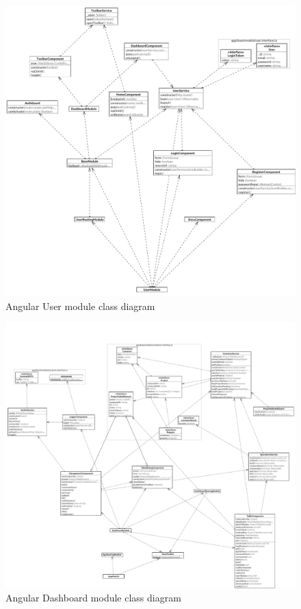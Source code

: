 \documentclass[multi, tikz, a4paper, oneside]{article}
\begin{document}
\begin{figure}[h]
  \centering \includegraphics[scale=0.15]{diagrams/client-side_diagram1.png}
  \caption{Angular User module class diagram}
  \label{fig:class-user}
\end{figure}
\begin{figure}[h]
  \centering
  \includegraphics[scale=0.1]{diagrams/client-side_diagram2.png}
  \caption{Angular Dashboard module class diagram}
  \label{fig:class-dashboard}
\end{figure}
\end{document}
